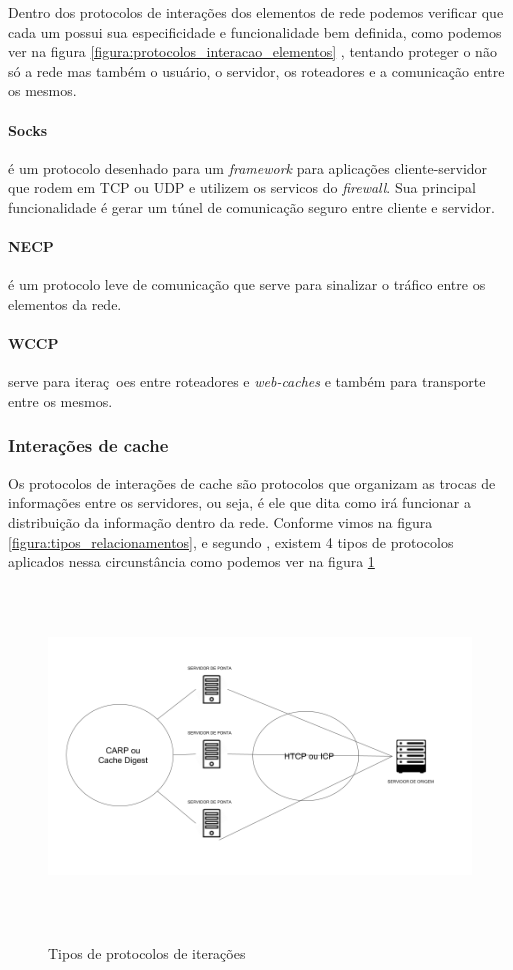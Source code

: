 Dentro dos protocolos de intera\c{c}\~oes dos elementos de rede podemos verificar que cada um possui sua especificidade e funcionalidade bem definida, como podemos ver na figura \ref{figura:protocolos_interacao_elementos} , tentando proteger o n\~ao s\'o a rede mas tamb\'em o usu\'ario, o servidor, os roteadores e a comunica\c{c}\~ao entre os mesmos.
\paragraph{Socks} \'e um protocolo desenhado para um \textit{framework} para aplica\c{c}\~oes cliente-servidor que rodem em TCP ou UDP e utilizem os servi{c}os do \textit{firewall}. Sua principal funcionalidade \'e gerar um t\'unel de comunica\c{c}\~ao seguro entre cliente e servidor.
\paragraph{NECP} \'e um protocolo leve de comunica\c{c}\~ao que serve para sinalizar o tr\'afico entre os elementos da rede.
\paragraph{WCCP} serve para itera\c{c}~oes entre roteadores e \textit{web-caches}	e tamb\'em para transporte entre os mesmos.


\subsubsection{Intera\c{c}\~oes de cache}

Os protocolos de intera\c{c}\~oes de cache s\~ao protocolos que organizam as trocas de informa\c{c}\~oes entre os servidores, ou seja, \'e ele que dita como ir\'a funcionar a distribui\c{c}\~ao da informa\c{c}\~ao dentro da rede.
\newline Conforme vimos na figura \ref{figura:tipos_relacionamentos}, e segundo \cite{pathan2007taxonomy}, existem 4 tipos de protocolos aplicados nessa circunst\^ancia como podemos ver na figura \ref{figura:protocolos_interacao_cache}
\begin{figure}[H]
\caption{Tipos de protocolos de itera\c{c}\~oes}
\includegraphics[height=9cm]{Figuras/protocolos_interacoes_cache.png} 
\label{figura:protocolos_interacao_cache}
\end{figure}

